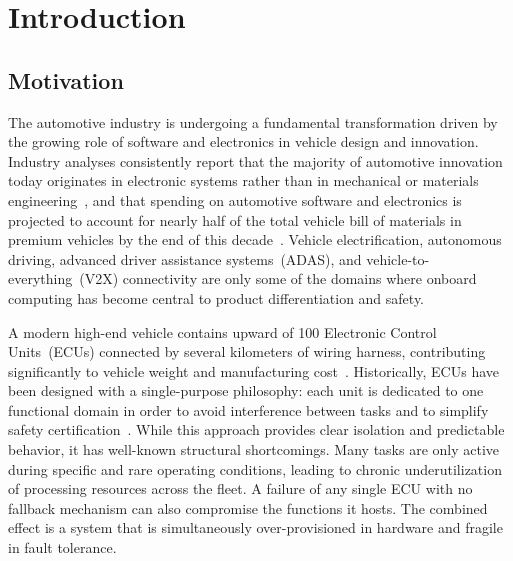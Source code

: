 
\chapter{Introduction}\label{chap:introduction}
\section{Motivation}
\label{sec:motivation}

The automotive industry is undergoing a fundamental transformation driven by the
growing role of software and electronics in vehicle design and innovation. Industry
analyses consistently report that the majority of automotive innovation today originates
in electronic systems rather than in mechanical or materials engineering~\cite{ey1},
and that spending on automotive software and electronics is projected to account for
nearly half of the total vehicle bill of materials in premium vehicles by the end of
this decade~\cite{pwc1}. Vehicle electrification, autonomous driving, advanced driver
assistance systems~(ADAS), and vehicle-to-everything~(V2X) connectivity are only some
of the domains where onboard computing has become central to product differentiation
and safety.

A modern high-end vehicle contains upward of 100 Electronic Control Units~(ECUs)
connected by several kilometers of wiring harness, contributing significantly to
vehicle weight and manufacturing cost~\cite{vipin2,baunach2018}. Historically, ECUs
have been designed with a single-purpose philosophy: each unit is dedicated to one
functional domain in order to avoid interference between tasks and to simplify safety
certification~\cite{vipin1,vipin2}. While this approach provides clear isolation and
predictable behavior, it has well-known structural shortcomings. Many tasks are only
active during specific and rare operating conditions, leading to chronic
underutilization of processing resources across the fleet. A failure of any single ECU
with no fallback mechanism can also compromise the functions it hosts. The combined
effect is a system that is simultaneously over-provisioned in hardware and fragile in
fault tolerance.


